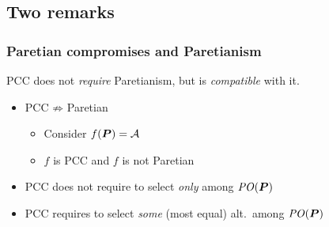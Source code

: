 \documentclass[french, english]{beamer}
\begin{document}
\subsection{Two remarks}
\begin{frame}
	\frametitle{Paretian compromises and Paretianism}
	PCC does not \emph{require} Paretianism, but is \emph{compatible} with it.
	\begin{itemize}
		\item PCC $\not⇒$ Paretian
		\begin{itemize}
			\item Consider $f(\boldsymbol{P}) = \mathcal{A}$
			\item $f$ is PCC and $f$ is not Paretian
		\end{itemize}
		\item PCC does not require to select \emph{only} among $\mathit{PO}(\boldsymbol{P})$
		\item PCC requires to select \emph{some} {(most equal)} alt.\ among $\mathit{PO}(\boldsymbol{P})$
	\end{itemize}
\end{frame}

\end{document}
